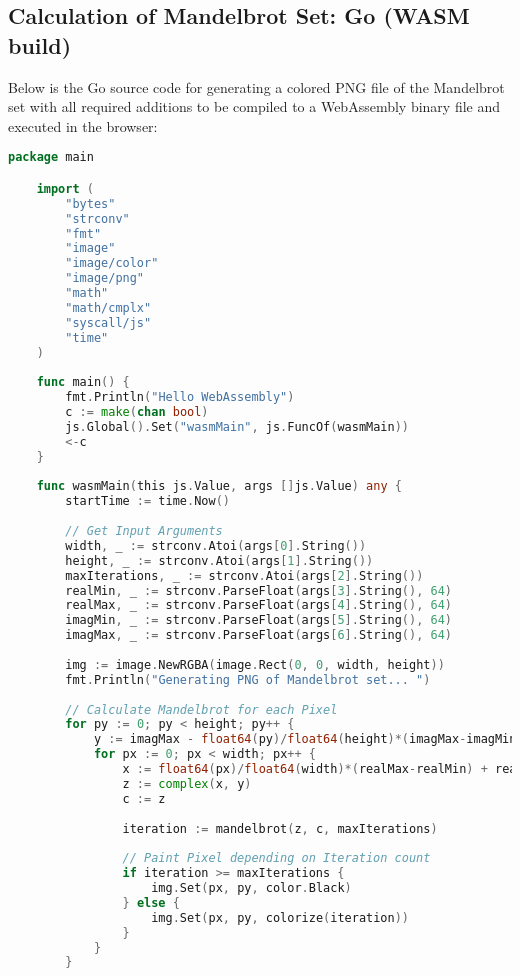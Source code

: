 \subsection{Calculation of Mandelbrot Set: Go (WASM build)}
\label{app:code:mandelbrot2}
Below is the Go source code for generating a colored PNG file of the Mandelbrot set with all required additions to be compiled to a WebAssembly binary file and executed in the browser:

\begin{lstlisting}[language=go, frame=tb, caption={Mandelbrot Set Calculation (WASM build)}]
    package main

    import (
        "bytes"
        "strconv"
        "fmt"
        "image"
        "image/color"
        "image/png"
        "math"
        "math/cmplx"
        "syscall/js"
        "time"
    )
    
    func main() {
        fmt.Println("Hello WebAssembly")
        c := make(chan bool)
        js.Global().Set("wasmMain", js.FuncOf(wasmMain))
        <-c
    }
    
    func wasmMain(this js.Value, args []js.Value) any {
        startTime := time.Now()
    
        // Get Input Arguments
        width, _ := strconv.Atoi(args[0].String())
        height, _ := strconv.Atoi(args[1].String())
        maxIterations, _ := strconv.Atoi(args[2].String())
        realMin, _ := strconv.ParseFloat(args[3].String(), 64)
        realMax, _ := strconv.ParseFloat(args[4].String(), 64)
        imagMin, _ := strconv.ParseFloat(args[5].String(), 64)
        imagMax, _ := strconv.ParseFloat(args[6].String(), 64)
    
        img := image.NewRGBA(image.Rect(0, 0, width, height))
        fmt.Println("Generating PNG of Mandelbrot set... ")
    
        // Calculate Mandelbrot for each Pixel
        for py := 0; py < height; py++ {
            y := imagMax - float64(py)/float64(height)*(imagMax-imagMin)
            for px := 0; px < width; px++ {
                x := float64(px)/float64(width)*(realMax-realMin) + realMin
                z := complex(x, y)
                c := z
    
                iteration := mandelbrot(z, c, maxIterations)
    
                // Paint Pixel depending on Iteration count
                if iteration >= maxIterations {
                    img.Set(px, py, color.Black)
                } else {
                    img.Set(px, py, colorize(iteration))
                }
            }
        }
    

\end{lstlisting}
